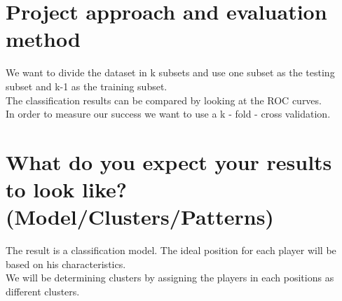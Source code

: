 \documentclass[runningheads]{llncs}
\begin{document}


\section{Project approach and evaluation method}

We want to divide the dataset in k subsets and use one subset as the testing subset and k-1 as the training subset. \\
The classification results can be compared by looking at the ROC curves.\\
In order to measure our success we want to use a k - fold - cross validation. \\



\section{What do you expect your results to look like? (Model/Clusters/Patterns)}
The result is a classification model. The ideal position for each player will be based on his characteristics.\\
We will be determining clusters by assigning the players in each positions as different clusters.




%
%
% 
% 
%
%
%
%
%
\end{document}
